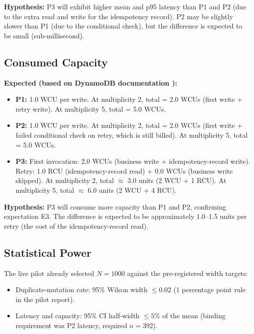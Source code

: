 \textbf{Hypothesis:} P3 will exhibit higher mean and p95 latency than P1 and P2 (due to the extra read and write for the idempotency record). P2 may be slightly slower than P1 (due to the conditional check), but the difference is expected to be small (sub-millisecond).

\subsection{Consumed Capacity}

\textbf{Expected (based on DynamoDB documentation \citep{AWSDynamoDBDocs}):}

\begin{itemize}
    \item \textbf{P1:} 1.0 WCU per write. At multiplicity 2, total = 2.0 WCUs (first write + retry write). At multiplicity 5, total = 5.0 WCUs.
    \item \textbf{P2:} 1.0 WCU per write. At multiplicity 2, total = 2.0 WCUs (first write + failed conditional check on retry, which is still billed). At multiplicity 5, total = 5.0 WCUs.
    \item \textbf{P3:} First invocation: 2.0 WCUs (business write + idempotency-record write). Retry: 1.0 RCU (idempotency-record read) + 0.0 WCUs (business write skipped). At multiplicity 2, total $\approx$ 3.0 units (2 WCU + 1 RCU). At multiplicity 5, total $\approx$ 6.0 units (2 WCU + 4 RCU).
\end{itemize}

\textbf{Hypothesis:} P3 will consume more capacity than P1 and P2, confirming expectation E3. The difference is expected to be approximately 1.0--1.5 units per retry (the cost of the idempotency-record read).

\subsection{Statistical Power}

The live pilot already selected $N = 1000$ against the pre-registered width targets:

\begin{itemize}
    \item Duplicate-mutation rate: 95\% Wilson width $\leq 0.02$ (1 percentage point rule in the pilot report).
    \item Latency and capacity: 95\% CI half-width $\leq 5\%$ of the mean (binding requirement was P2 latency, required $n=392$).
\end{itemize}

